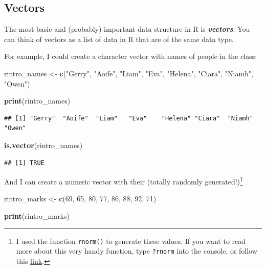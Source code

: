 \documentclass[
]{book}
\newenvironment{Shaded}{\begin{snugshade}}{\end{snugshade}}
\newcommand{\DecValTok}[1]{\textcolor[rgb]{0.00,0.00,0.81}{#1}}
\newcommand{\FunctionTok}[1]{\textcolor[rgb]{0.13,0.29,0.53}{\textbf{#1}}}
\newcommand{\NormalTok}[1]{#1}
\newcommand{\OtherTok}[1]{\textcolor[rgb]{0.56,0.35,0.01}{#1}}
\newcommand{\StringTok}[1]{\textcolor[rgb]{0.31,0.60,0.02}{#1}}
\begin{document}
\hypertarget{vectors}{%
\subsection{Vectors}\label{vectors}}

The most basic and (probably) important data structure in R is \textbf{\emph{vectors}}. You can think of vectors as a list of data in R that are of the same data type.

For example, I could create a character vector with names of people in the class:

\begin{Shaded}
\begin{Highlighting}[]
\NormalTok{rintro\_names }\OtherTok{\textless{}{-}} \FunctionTok{c}\NormalTok{(}\StringTok{"Gerry"}\NormalTok{, }\StringTok{"Aoife"}\NormalTok{, }\StringTok{"Liam"}\NormalTok{, }\StringTok{"Eva"}\NormalTok{, }\StringTok{"Helena"}\NormalTok{, }\StringTok{"Ciara"}\NormalTok{, }\StringTok{"Niamh"}\NormalTok{, }\StringTok{"Owen"}\NormalTok{)}


\FunctionTok{print}\NormalTok{(rintro\_names)}
\end{Highlighting}
\end{Shaded}

\begin{verbatim}
## [1] "Gerry"  "Aoife"  "Liam"   "Eva"    "Helena" "Ciara"  "Niamh"  "Owen"
\end{verbatim}

\begin{Shaded}
\begin{Highlighting}[]
\FunctionTok{is.vector}\NormalTok{(rintro\_names) }
\end{Highlighting}
\end{Shaded}

\begin{verbatim}
## [1] TRUE
\end{verbatim}

And I can create a numeric vector with their (totally randomly generated!)\footnote{I used the function \texttt{rnorm()} to generate these values. If you want to read more about this very handy function, type \texttt{?rnorm} into the console, or follow this \href{https://www.statology.org/r-runif-vs-rnorm/}{link}.}

\begin{Shaded}
\begin{Highlighting}[]
\NormalTok{rintro\_marks }\OtherTok{\textless{}{-}} \FunctionTok{c}\NormalTok{(}\DecValTok{69}\NormalTok{, }\DecValTok{65}\NormalTok{, }\DecValTok{80}\NormalTok{, }\DecValTok{77}\NormalTok{, }\DecValTok{86}\NormalTok{, }\DecValTok{88}\NormalTok{, }\DecValTok{92}\NormalTok{, }\DecValTok{71}\NormalTok{)}

\FunctionTok{print}\NormalTok{(rintro\_marks)}
\end{Highlighting}
\end{Shaded}
\end{document}
